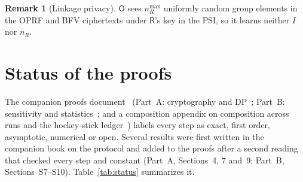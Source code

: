 \documentclass[11pt]{article}
\theoremstyle{definition}
\newtheorem{remark}{Remark}[section]
\theoremstyle{plain}
\newcommand{\Party}[1]{\textsf{#1}}
\newcommand{\Rp}{\Party{R}}
\newcommand{\Op}{\Party{O}}
\begin{document}
\begin{remark}[Linkage privacy]
$\Op$ sees $n_R^{\max}$ uniformly random group elements in the OPRF and BFV ciphertexts under $\Rp$'s key in the PSI, so it learns neither $I$ nor $n_R$.
\end{remark}

\section{Status of the proofs}
\label{app:status}

The companion proofs document~\cite{vfrproofs} (Part~A: cryptography and DP~\cite{vfrproofsA}; Part~B: sensitivity and statistics~\cite{vfrproofsB}; and a composition appendix on composition across runs and the hockey-stick ledger~\cite{vfrproofsC}) labels every step as exact, first order, asymptotic, numerical or open. Several results were first written in the companion book on the protocol and added to the proofs after a second reading that checked every step and constant (Part~A, Sections~4, 7 and~9; Part~B, Sections~S7--S10). Table~\ref{tab:status} summarizes it.
\end{document}
